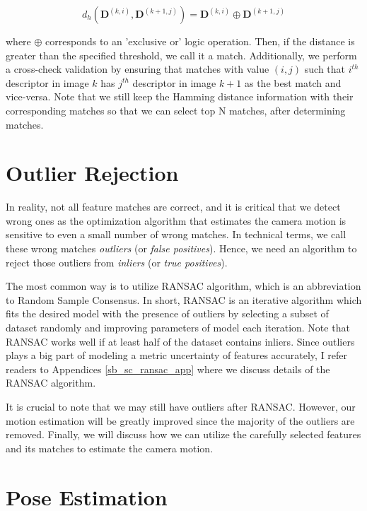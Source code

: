 \documentclass[a4paper]{report}
\numberwithin{figure}{section}
\begin{document}
\begin{equation}
  d_h(\mathbf{D}^{(k,i)},\mathbf{D}^{(k+1,j)}) = \mathbf{D}^{(k,i)} \oplus 
  \mathbf{D}^{(k+1, j)}
\end{equation}

where $\oplus$ corresponds to an 'exclusive or' logic operation. Then, if the 
distance is greater than the specified threshold, we call it a match. 
Additionally, we perform a cross-check validation by ensuring that matches 
with value $(i,j)$ such that $i^{th}$ descriptor in image $k$ has $j^{th}$ 
descriptor in image $k+1$ as the best match and vice-versa.
Note that we still keep the Hamming distance information with their 
corresponding matches so that we can select top N matches, after 
determining matches.


\section{Outlier Rejection} \label{sb_sc_ransac}

In reality, not all feature matches are correct, and it is critical that we 
detect wrong ones as the optimization algorithm that estimates the camera 
motion is sensitive to even a small number of wrong matches. In technical 
terms, we call these wrong matches \textit{outliers} (or \textit{false 
positives}). Hence, we need an algorithm to reject those outliers from 
\textit{inliers} (or \textit{true positives}). 

The most common way is to utilize 
RANSAC 
\parencite{Fischler1981b} algorithm, 
which is an abbreviation to Random Sample Consensus. In short, RANSAC is an 
iterative 
algorithm which fits the desired model with the presence of outliers by 
selecting a subset of dataset randomly and improving parameters of model each 
iteration. Note that RANSAC works well if at least half of the dataset 
contains inliers. Since outliers plays a big part of modeling a metric 
uncertainty of features accurately, I refer readers to Appendices 
\ref{sb_sc_ransac_app} 
where we discuss details of the RANSAC algorithm. 


It is crucial to note that we may still have outliers after RANSAC.  However, 
our motion estimation will be greatly improved since the majority of the 
outliers are removed.  Finally, we will discuss how we can utilize the 
carefully selected features and its matches to estimate the camera motion. 


\section{Pose Estimation} \label{sc_pose_estimation}
\end{document}
